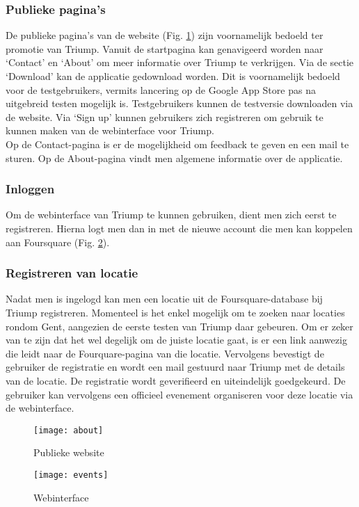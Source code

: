 \subsubsection{Publieke pagina's}
De publieke pagina's van de website (Fig. \ref{fig:about}) zijn voornamelijk bedoeld ter promotie van Triump. Vanuit de startpagina kan genavigeerd worden naar `Contact' en `About' om meer informatie over Triump te verkrijgen. Via de sectie `Download' kan de applicatie gedownload worden. Dit is voornamelijk bedoeld voor de testgebruikers, vermits lancering op de Google App Store pas na uitgebreid testen mogelijk is. Testgebruikers kunnen de testversie downloaden via de website. Via `Sign up' kunnen gebruikers zich registreren om gebruik te kunnen maken van de webinterface voor Triump.\\
Op de Contact-pagina is er de mogelijkheid om feedback te geven en een mail te sturen.
Op de About-pagina vindt men algemene informatie over de applicatie.
\subsubsection{Inloggen}
Om de webinterface van Triump te kunnen gebruiken, dient men zich eerst te registreren. Hierna logt men dan in met de nieuwe account die men kan koppelen aan Foursquare (Fig. \ref{fig:events}).
\subsubsection{Registreren van locatie}
Nadat men is ingelogd kan men een locatie uit de Foursquare-database bij Triump registreren.
Momenteel is het enkel mogelijk om te zoeken naar locaties rondom Gent, aangezien de eerste testen van Triump daar gebeuren.
Om er zeker van te zijn dat het wel degelijk om de juiste locatie gaat, is er een link aanwezig die leidt naar de Fourquare-pagina van die locatie.
Vervolgens bevestigt de gebruiker de registratie en wordt een mail gestuurd naar Triump met de details van de locatie. De registratie wordt geverifieerd en uiteindelijk goedgekeurd.
De gebruiker kan vervolgens een officieel evenement organiseren voor deze locatie via de webinterface.
\begin{figure}[H]
	\centering
	\texttt{[image: about]}
	\caption{Publieke website }
	\label{fig:about}
\end{figure}

\begin{figure}[H]
	\centering
	\texttt{[image: events]}
	\caption{Webinterface }
	\label{fig:events}
\end{figure}


